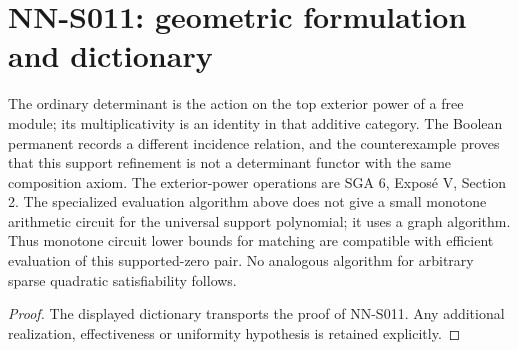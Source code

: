 \section{NN-S011: geometric formulation and dictionary}
\begin{geometricstatement}[NN-S011]
The ordinary determinant is the action on the top exterior power
of a free module; its multiplicativity is an identity in that
additive category. The Boolean permanent records a different
incidence relation, and the counterexample proves that this
support refinement is not a determinant functor with the same
composition axiom. The exterior-power operations are SGA 6,
Expos\'e V, Section 2. The specialized evaluation algorithm above
does not give a small monotone arithmetic circuit for the
universal support polynomial; it uses a graph algorithm. Thus
monotone circuit lower bounds for matching are compatible with
efficient evaluation of this supported-zero pair. No analogous
algorithm for arbitrary sparse quadratic satisfiability follows.
\end{geometricstatement}
\begin{proof} The displayed dictionary transports the proof of NN-S011. Any additional realization, effectiveness or uniformity hypothesis is retained explicitly.\end{proof}


